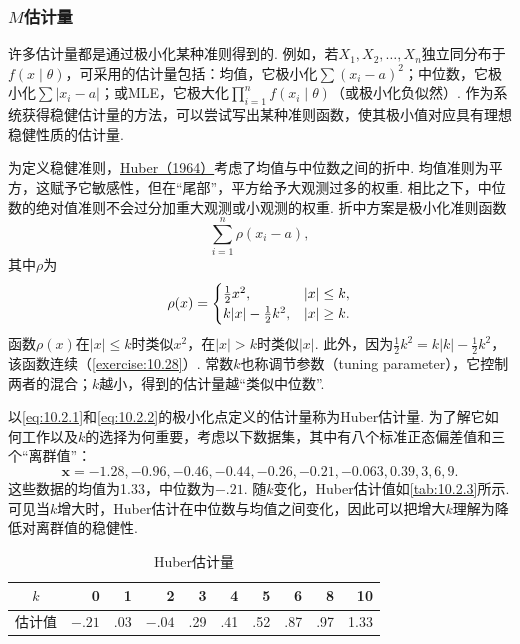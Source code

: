 \subsubsection{\texorpdfstring{$M$}{M}估计量}\label{sec:10.2.2}
许多估计量都是通过极小化某种准则得到的. 例如，若$X_1,X_2,\ldots,X_n$独立同分布于$f(x\mid\theta)$，可采用的估计量包括：均值，它极小化$\sum(x_i-a)^2$；中位数，它极小化$\sum|x_i-a|$；或MLE，它极大化$\prod_{i=1}^nf(x_i\mid\theta)$（或极小化负似然）. 作为系统获得稳健估计量的方法，可以尝试写出某种准则函数，使其极小值对应具有理想稳健性质的估计量.

为定义稳健准则，\hyperref[bib:source170]{Huber（1964）}考虑了均值与中位数之间的折中. 均值准则为平方，这赋予它敏感性，但在“尾部”，平方给予大观测过多的权重. 相比之下，中位数的绝对值准则不会过分加重大观测或小观测的权重. 折中方案是极小化准则函数
\begin{equation}\label{eq:10.2.1}
\sum_{i=1}^n\rho(x_i-a),
\end{equation}
其中$\rho$为
\begin{equation}\label{eq:10.2.2}\index{SI1043@调节参数}
\rho(x)=\begin{cases}\frac12x^2,&|x|\leq k,\\k|x|-\frac12k^2,&|x|\geq k.\end{cases}
\end{equation}
函数$\rho(x)$在$|x|\leq k$时类似$x^2$，在$|x|>k$时类似$|x|$. 此外，因为$\frac12k^2=k|k|-\frac12k^2$，该函数连续（\autoref{exercise:10.28}）. 常数$k$也称调节参数（tuning parameter），它控制两者的混合；$k$越小，得到的估计量越“类似中位数”.

\begin{example}[Huber估计量]\label{ex:10.2.5}
以\eqref{eq:10.2.1}和\eqref{eq:10.2.2}的极小化点定义的估计量称为Huber估计量. 为了解它如何工作以及$k$的选择为何重要，考虑以下数据集，其中有八个标准正态偏差值和三个“离群值”：
$$\boldsymbol x=-1.28,-0.96,-0.46,-0.44,-0.26,-0.21,-0.063,0.39,3,6,9.$$
这些数据的均值为1.33，中位数为$-.21$. 随$k$变化，Huber估计值如\autoref{tab:10.2.3}所示. 可见当$k$增大时，Huber估计在中位数与均值之间变化，因此可以把增大$k$理解为降低对离群值的稳健性.

\par\begin{table}[htbp]\centering
\caption{Huber估计量}\label{tab:10.2.3}
\begin{tabular}{c|rrrrrrrrr}\toprule
$k$&0&1&2&3&4&5&6&8&10\\\midrule
估计值&$-.21$&.03&$-.04$&.29&.41&.52&.87&.97&1.33\\\bottomrule
\end{tabular}
\end{table}\par
\end{example}

